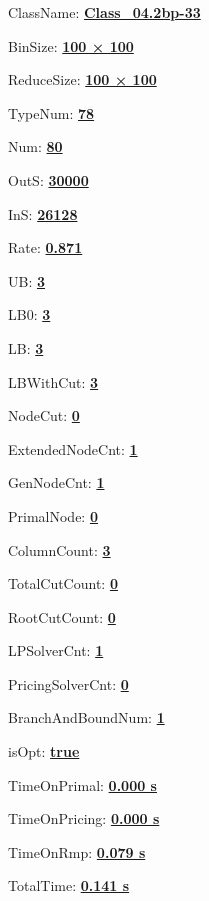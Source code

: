 \documentclass[11pt]{article}
\begin{document}
\pagestyle{empty}


ClassName: \underline{\textbf{Class_04.2bp-33}}
\par
BinSize: \underline{\textbf{100 × 100}}
\par
ReduceSize: \underline{\textbf{100 × 100}}
\par
TypeNum: \underline{\textbf{78}}
\par
Num: \underline{\textbf{80}}
\par
OutS: \underline{\textbf{30000}}
\par
InS: \underline{\textbf{26128}}
\par
Rate: \underline{\textbf{0.871}}
\par
UB: \underline{\textbf{3}}
\par
LB0: \underline{\textbf{3}}
\par
LB: \underline{\textbf{3}}
\par
LBWithCut: \underline{\textbf{3}}
\par
NodeCut: \underline{\textbf{0}}
\par
ExtendedNodeCnt: \underline{\textbf{1}}
\par
GenNodeCnt: \underline{\textbf{1}}
\par
PrimalNode: \underline{\textbf{0}}
\par
ColumnCount: \underline{\textbf{3}}
\par
TotalCutCount: \underline{\textbf{0}}
\par
RootCutCount: \underline{\textbf{0}}
\par
LPSolverCnt: \underline{\textbf{1}}
\par
PricingSolverCnt: \underline{\textbf{0}}
\par
BranchAndBoundNum: \underline{\textbf{1}}
\par
isOpt: \underline{\textbf{true}}
\par
TimeOnPrimal: \underline{\textbf{0.000 s}}
\par
TimeOnPricing: \underline{\textbf{0.000 s}}
\par
TimeOnRmp: \underline{\textbf{0.079 s}}
\par
TotalTime: \underline{\textbf{0.141 s}}
\par
\newpage
\end{document}
